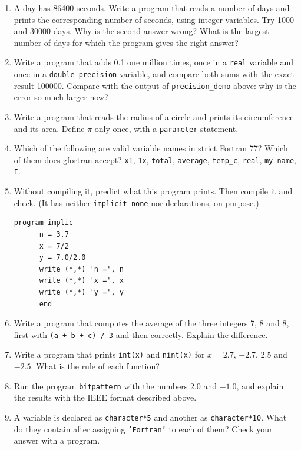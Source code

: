 \begin{enumerate}
    \item A day has 86400 seconds. Write a program that reads a number of days and prints the corresponding number of seconds, using integer variables. Try 1000 and 30000 days. Why is the second answer wrong? What is the largest number of days for which the program gives the right answer?
    \item Write a program that adds 0.1 one million times, once in a \texttt{real} variable and once in a \texttt{double precision} variable, and compare both sums with the exact result 100000. Compare with the output of \texttt{precision\_demo} above: why is the error so much larger now?
    \item Write a program that reads the radius of a circle and prints its circumference and its area. Define $\pi$ only once, with a \texttt{parameter} statement.
    \item Which of the following are valid variable names in strict Fortran 77? Which of them does gfortran accept? \quad \texttt{x1}, \texttt{1x}, \texttt{total}, \texttt{average}, \texttt{temp\_c}, \texttt{real}, \texttt{my name}, \texttt{I}.
    \item Without compiling it, predict what this program prints. Then compile it and check. (It has neither \texttt{implicit none} nor declarations, on purpose.)
\begin{lstlisting}[style=fortran77]
      program implic
      n = 3.7
      x = 7/2
      y = 7.0/2.0
      write (*,*) 'n =', n
      write (*,*) 'x =', x
      write (*,*) 'y =', y
      end
\end{lstlisting}
    \item Write a program that computes the average of the three integers 7, 8 and 8, first with \texttt{(a + b + c) / 3} and then correctly. Explain the difference.
    \item Write a program that prints \texttt{int(x)} and \texttt{nint(x)} for $x = 2.7$, $-2.7$, $2.5$ and $-2.5$. What is the rule of each function?
    \item Run the program \texttt{bitpattern} with the numbers 2.0 and $-1.0$, and explain the results with the IEEE format described above.
    \item A variable is declared as \texttt{character*5} and another as \texttt{character*10}. What do they contain after assigning \texttt{'Fortran'} to each of them? Check your answer with a program.
\end{enumerate}
